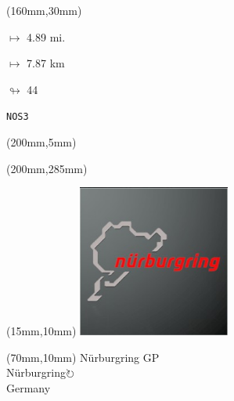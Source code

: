 \begin{textblock*}{40mm}(160mm,30mm)%
\Large
\par$\mapsto$ 4.89 mi.
\par$\mapsto$ 7.87 km
\par$\looparrowright$ 44
\par\hfill\tiny\tt NOS3\\
\end{textblock*}
\begin{textblock*}{20mm}(200mm,5mm)%
\fbox{\thepage}
\label{NOS3}
\end{textblock*}
\begin{textblock*}{20mm}(200mm,285mm)%
\fbox{\thepage}
\end{textblock*}

\null\newpage
\begin{textblock*}{50mm}(15mm,10mm)%
\includegraphics[width=50mm]{LG/2015-05-20_00089.png}
\end{textblock*}
\begin{textblock*}{130mm}(70mm,10mm)%
{\fontsize{20}{20}\selectfont Nürburgring GP\\}
{\fontsize{16}{16}\selectfont Nürburgring\hfill \Large$\circlearrowright$\\}
{\fontsize{12}{12}\selectfont Germany\\}
\end{textblock*}
